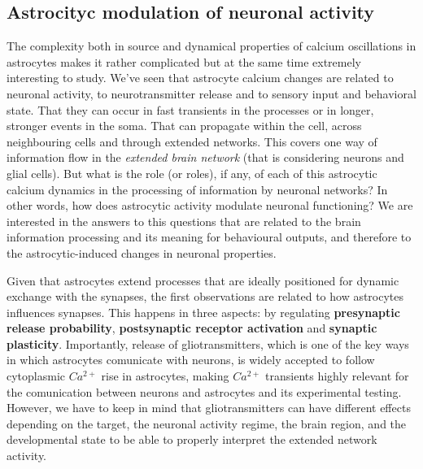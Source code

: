 \subsection{Astrocityc modulation of neuronal activity}
\label{chap1:sec:2:subsec2:astro_neuromodulation}
The complexity both in source and dynamical properties of calcium oscillations in astrocytes makes it rather complicated but at the same time extremely interesting to study.
We've seen that astrocyte calcium changes are related to neuronal activity, to neurotransmitter release and to sensory input and behavioral state.
That they can occur in fast transients in the processes or in longer, stronger events in the soma. 
That can propagate within the cell, across neighbouring cells and through extended networks.
This covers one way of information flow in the \textit{extended brain network} (that is considering neurons and glial cells). 
But what is the role (or roles), if any, of each of this astrocytic calcium dynamics in the processing of information by neuronal networks?
In other words, how does astrocytic activity modulate neuronal functioning?
We are interested in the answers to this questions that are related to the brain information processing and its meaning for behavioural outputs, and therefore to the astrocytic-induced changes in neuronal properties. 

Given that astrocytes extend processes that are ideally positioned for dynamic exchange with the synapses, the first observations are related to how astrocytes influences synapses. 
This happens in three aspects: by regulating \textbf{presynaptic release probability}, \textbf{postsynaptic receptor activation} and \textbf{synaptic plasticity}.
Importantly, release of gliotransmitters, which is one of the key ways in which astrocytes comunicate with neurons, is widely accepted to follow cytoplasmic $Ca^{2+}$ rise in astrocytes, making $Ca^{2+}$ transients highly relevant for the comunication between neurons and astrocytes and its experimental testing.
However, we have to keep in mind that gliotransmitters can have different effects depending on the target, the neuronal activity regime, the brain region, and the developmental state to be able to properly interpret the extended network activity. 


